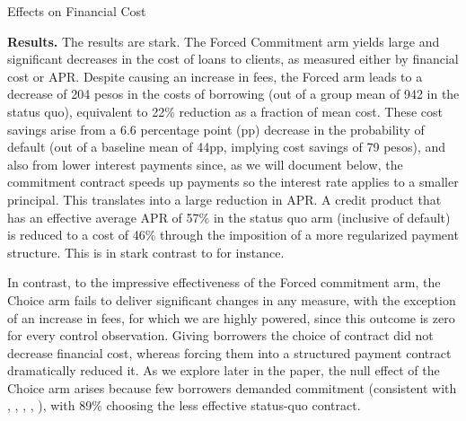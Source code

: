 \documentclass[ecta,nameyear,final]{econsocart}
\begin{document}
\begin{table}
\caption{Effects on Financial Cost}
\label{main_impact_table}
\begin{center}
\resizebox{0.9\textwidth}{!}{
\scriptsize{}
}
\end{center}

\end{table}




\noindent \textbf{Results.} The results are stark. The Forced Commitment arm yields large and significant decreases in the cost of loans to clients, as measured either by financial cost or APR. Despite causing an increase in fees, the Forced arm leads to a decrease of 204 pesos in the costs of borrowing (out of a group mean of 942 in the status quo), equivalent to 22\% reduction as a fraction of mean cost. These cost savings arise from a 6.6 percentage point (pp) decrease in the probability of default (out of a baseline mean of 44pp,  implying cost savings of 79 pesos), and also from lower interest payments since, as we will document below, the commitment contract speeds up payments so the interest rate applies to a smaller principal. This translates into a large reduction in APR. A credit product that has an effective average APR of 57\% in the status quo arm (inclusive of default) is reduced to a cost of 46\% through the imposition of a more regularized payment structure. This is in stark contrast to \cite{Pande} for instance.  

In contrast, to the impressive effectiveness of the Forced commitment arm, the Choice arm fails to deliver significant changes in any measure, with the exception of an increase in fees, for which we are highly powered, since this outcome is zero for every control observation. Giving borrowers the choice of contract did not decrease financial cost, whereas forcing them into a structured payment contract dramatically reduced it. As we explore later in the paper, the null effect of the Choice arm arises because few borrowers demanded commitment (consistent with \cite{Ashraf}, \cite{Gine}, \cite{Ted}, \cite{Royer}, \cite{Sprenger}), with 89\% choosing the less effective status-quo contract.
\end{document}
